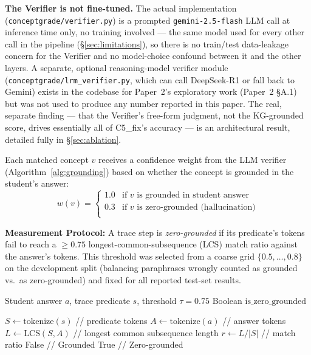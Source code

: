 \documentclass[conference]{IEEEtran}
\begin{document}
\textbf{The Verifier is not fine-tuned.} The actual implementation
(\texttt{conceptgrade/verifier.py}) is a prompted
\texttt{gemini-2.5-flash} LLM call at inference time only, no
training involved --- the same model used for every other call in
the pipeline (\S\ref{sec:limitations}), so there is no train/test
data-leakage concern for the Verifier and no model-choice confound
between it and the other layers. A separate, optional reasoning-model
verifier module (\texttt{conceptgrade/lrm\_verifier.py}, which can
call DeepSeek-R1 or fall back to Gemini) exists in the codebase for
Paper~2's exploratory work (Paper~2 §A.1) but was not used to produce
any number reported in this paper. The real, separate finding ---
that the Verifier's free-form judgment, not the KG-grounded score, drives essentially all
of C5\_fix's accuracy --- is an architectural result, detailed fully in
\S\ref{sec:ablation}.

Each matched concept $v$ receives a confidence weight from the LLM verifier
(Algorithm~\ref{alg:grounding}) based on whether the concept is grounded in
the student's answer:
\begin{equation}
  w(v) =
  \begin{cases}
    1.0 & \text{if } v \text{ is grounded in student answer} \\
    0.3 & \text{if } v \text{ is zero-grounded (hallucination)} \\
  \end{cases}
  \label{eq:verifier_weight}
\end{equation}

\textbf{Measurement Protocol:} A trace step is \emph{zero-grounded} if
its predicate's tokens fail to reach a $\geq 0.75$
longest-common-subsequence (LCS) match ratio against the answer's
tokens. This threshold was selected from a coarse grid $\{0.5,
\ldots, 0.8\}$ on the development split (balancing paraphrases wrongly
counted as grounded vs.\ as zero-grounded) and fixed for all reported
test-set results.

\begin{algorithm}[h]
\caption{Zero-Grounding Detection}
\label{alg:grounding}
\begin{algorithmic}
  \REQUIRE Student answer $a$, trace predicate $s$, threshold $\tau = 0.75$
  \ENSURE Boolean $\text{is\_zero\_grounded}$

  \STATE $S \gets \text{tokenize}(s)$ \quad // predicate tokens
  \STATE $A \gets \text{tokenize}(a)$ \quad // answer tokens
  \STATE $L \gets \text{LCS}(S, A)$ \quad // longest common subsequence length
  \STATE $r \gets L / |S|$ \quad // match ratio
    \RETURN False \quad // Grounded
  \ELSE
    \RETURN True \quad // Zero-grounded
  \ENDIF
\end{algorithmic}
\end{algorithm}
\end{document}
